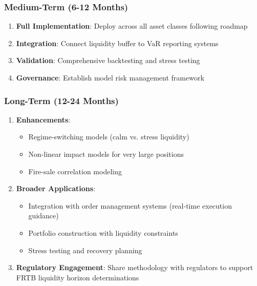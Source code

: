 \documentclass[11pt,a4paper]{article}
\begin{document}
\subsubsection{Medium-Term (6-12 Months)}

\begin{enumerate}
    \item \textbf{Full Implementation}: Deploy across all asset classes following roadmap

    \item \textbf{Integration}: Connect liquidity buffer to VaR reporting systems

    \item \textbf{Validation}: Comprehensive backtesting and stress testing

    \item \textbf{Governance}: Establish model risk management framework
\end{enumerate}

\subsubsection{Long-Term (12-24 Months)}

\begin{enumerate}
    \item \textbf{Enhancements}:
    \begin{itemize}
        \item Regime-switching models (calm vs. stress liquidity)
        \item Non-linear impact models for very large positions
        \item Fire-sale correlation modeling
    \end{itemize}

    \item \textbf{Broader Applications}:
    \begin{itemize}
        \item Integration with order management systems (real-time execution guidance)
        \item Portfolio construction with liquidity constraints
        \item Stress testing and recovery planning
    \end{itemize}

    \item \textbf{Regulatory Engagement}: Share methodology with regulators to support FRTB liquidity horizon determinations
\end{enumerate}
\end{document}
